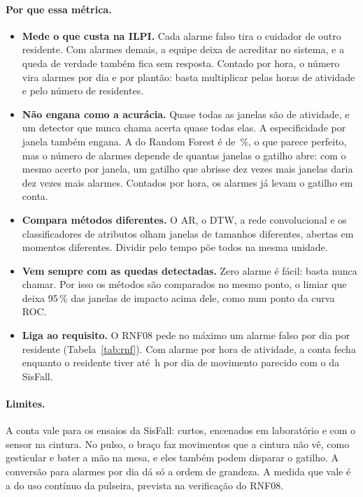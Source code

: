 \paragraph{Por que essa métrica.}
\begin{itemize}
  \item \textbf{Mede o que custa na ILPI.} Cada alarme falso tira o cuidador de outro
        residente. Com alarmes demais, a equipe deixa de acreditar no sistema, e a queda de
        verdade também fica sem resposta. Contado por hora, o número vira alarmes por dia e por
        plantão: basta multiplicar pelas horas de atividade e pelo número de residentes.
  \item \textbf{Não engana como a acurácia.} Quase todas as janelas são de atividade, e um
        detector que nunca chama acerta quase todas elas. A especificidade por janela também
        engana. A do Random Forest é de \rfEspecJanela\,\%, o que parece perfeito, mas o número
        de alarmes depende de quantas janelas o gatilho abre: com o mesmo acerto por janela, um
        gatilho que abrisse dez vezes mais janelas daria dez vezes mais alarmes. Contados por
        hora, os alarmes já levam o gatilho em conta.
  \item \textbf{Compara métodos diferentes.} O AR, o DTW, a rede convolucional e os
        classificadores de atributos olham janelas de tamanhos diferentes, abertas em momentos
        diferentes. Dividir pelo tempo põe todos na mesma unidade.
  \item \textbf{Vem sempre com as quedas detectadas.} Zero alarme é fácil: basta nunca chamar.
        Por isso os métodos são comparados no mesmo ponto, o limiar que deixa 95\,\% das
        janelas de impacto acima dele, como num ponto da curva ROC.
  \item \textbf{Liga ao requisito.} O RNF08 pede no máximo um alarme falso por dia por
        residente (Tabela~\ref{tab:rnf}). Com \rfAlarmes{} alarme por hora de atividade, a conta
        fecha enquanto o residente tiver até \rnfHorasDia\,h por dia de movimento parecido com o
        da SisFall.
\end{itemize}

\paragraph{Limites.} A conta vale para os ensaios da SisFall: curtos, encenados em laboratório
e com o sensor na cintura. No pulso, o braço faz movimentos que a cintura não vê, como
gesticular e bater a mão na mesa, e eles também podem disparar o gatilho. A conversão para
alarmes por dia dá só a ordem de grandeza. A medida que vale é a do uso contínuo da pulseira,
prevista na verificação do RNF08.

